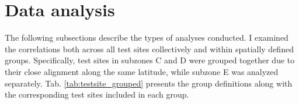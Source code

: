 \section{Data analysis}
The following subsections describe the types of analyses conducted. I examined the correlations both across all test sites collectively and within spatially defined groups. Specifically, test sites in subzones C and D were grouped together due to their close alignment along the same latitude, while subzone E was analyzed separately. Tab. \ref{tab:testsite_grouped} presents the group definitions along with the corresponding test sites included in each group.

\begin{table}[htbp]
\centering
\caption{Grouping of All Sites into Group C/D and Group E}
\label{tab:testsite_grouped}
\end{table}


